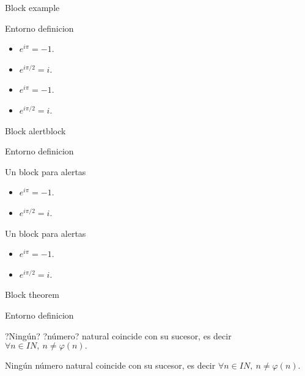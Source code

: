 \documentclass[]{beamer}
\theoremstyle{plain}
\begin{document}
\begin{frame}[fragile]{Block example}
\begin{source}{Entorno definicion}{}
\begin{example}
\begin{itemize}
\item $e^{i\pi}=-1$.
\item $e^{i\pi/2}=i$.
\end{itemize}
\end{example}
\end{source}
\begin{example}
\begin{itemize}
\item $e^{i\pi}=-1$.
\item $e^{i\pi/2}=i$.
\end{itemize}
\end{example}
\end{frame}
\begin{frame}[fragile]{Block alertblock}
\begin{source}{Entorno definicion}{}
\begin{alertblock}{Un block para alertas}
\begin{itemize}
\item $e^{i\pi}=-1$.
\item $e^{i\pi/2}=i$.
\end{itemize}
\end{alertblock}
\end{source}
\begin{alertblock}{Un block para alertas}
\begin{itemize}
\item $e^{i\pi}=-1$.
\item $e^{i\pi/2}=i$.
\end{itemize}
\end{alertblock}
\end{frame}
\begin{frame}[fragile]{Block theorem}
\begin{source}{Entorno definicion}{}
\begin{theorem}
?Ningún? ?número? natural coincide con su sucesor, es decir $\forall n\in I\!N,\: n\neq\varphi\left(n\right).$
\end{theorem}
\end{source}
\begin{theorem}
Ningún número natural coincide con su sucesor, es decir $\forall n\in I\!N,\: n\neq\varphi\left(n\right).$
\end{theorem}

\end{frame}
\end{document}
